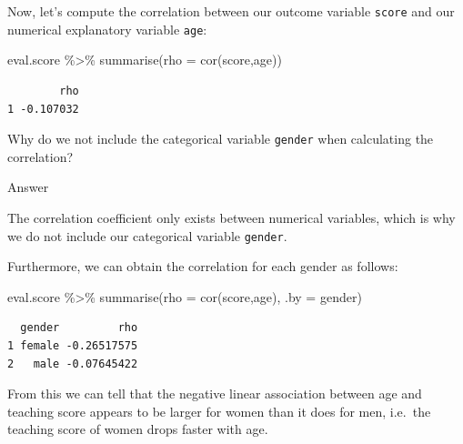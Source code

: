 \documentclass[
  letterpaper,
  DIV=11,
  numbers=noendperiod]{scrartcl}
\newenvironment{Shaded}{\begin{snugshade}}{\end{snugshade}}
\newcommand{\AttributeTok}[1]{\textcolor[rgb]{0.40,0.45,0.13}{#1}}
\newcommand{\FunctionTok}[1]{\textcolor[rgb]{0.28,0.35,0.67}{#1}}
\newcommand{\NormalTok}[1]{\textcolor[rgb]{0.00,0.23,0.31}{#1}}
\newcommand{\SpecialCharTok}[1]{\textcolor[rgb]{0.37,0.37,0.37}{#1}}
\begin{document}
Now, let's compute the correlation between our outcome variable
\texttt{score} and our numerical explanatory variable \texttt{age}:

\begin{Shaded}
\begin{Highlighting}[]
\NormalTok{eval.score }\SpecialCharTok{\%\textgreater{}\%}
  \FunctionTok{summarise}\NormalTok{(}\AttributeTok{rho =} \FunctionTok{cor}\NormalTok{(score,age))}
\end{Highlighting}
\end{Shaded}

\begin{verbatim}
        rho
1 -0.107032
\end{verbatim}

\begin{tcolorbox}[enhanced jigsaw, coltitle=black, bottomtitle=1mm, arc=.35mm, colframe=quarto-callout-tip-color-frame, left=2mm, opacityback=0, colback=white, title={Question}, toptitle=1mm, titlerule=0mm, breakable, rightrule=.15mm, bottomrule=.15mm, toprule=.15mm, colbacktitle=quarto-callout-tip-color!10!white, leftrule=.75mm, opacitybacktitle=0.6]

Why do we not include the categorical variable \texttt{gender} when
calculating the correlation?

Answer

The correlation coefficient only exists between numerical variables,
which is why we do not include our categorical variable \texttt{gender}.

\end{tcolorbox}

Furthermore, we can obtain the correlation for each gender as follows:

\begin{Shaded}
\begin{Highlighting}[]
\NormalTok{eval.score }\SpecialCharTok{\%\textgreater{}\%}
  \FunctionTok{summarise}\NormalTok{(}\AttributeTok{rho =} \FunctionTok{cor}\NormalTok{(score,age),}
            \AttributeTok{.by =}\NormalTok{ gender)}
\end{Highlighting}
\end{Shaded}

\begin{verbatim}
  gender         rho
1 female -0.26517575
2   male -0.07645422
\end{verbatim}

From this we can tell that the negative linear association between age
and teaching score appears to be larger for women than it does for men,
i.e.~the teaching score of women drops faster with age.
\end{document}

